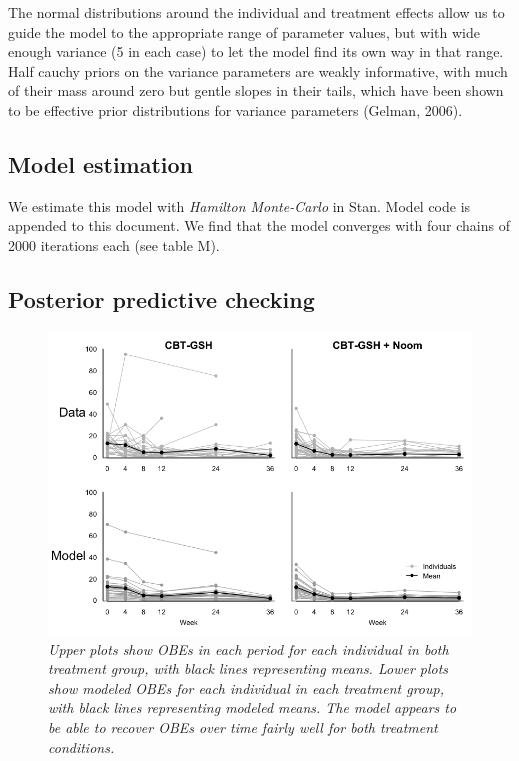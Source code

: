 \documentclass[12pt, oneside]{article}
\begin{document}
The normal distributions around the individual and treatment effects allow us to guide the model to the appropriate range of parameter values, but with wide enough variance (5 in each case) to let the model find its own way in that range.  Half cauchy priors on the variance parameters are weakly informative, with much of their mass around zero but gentle slopes in their tails, which have been shown to be effective prior distributions for variance parameters (Gelman, 2006).

\subsection{Model estimation}
We estimate this model with \emph{Hamilton Monte-Carlo} in Stan.  Model code is appended to this document.  We find that the model converges with four chains of 2000 iterations each (see table M).  

\subsection{Posterior predictive checking}

\begin{figure}
\centering
\includegraphics[width=\textwidth, height=\textheight, keepaspectratio]{ppc_sims.png}
\caption{\emph{Upper plots show OBEs in each period for each individual in both treatment group, with black lines representing means.  Lower plots show modeled OBEs for each individual in each treatment group, with black lines representing modeled means.  The model appears to be able to recover OBEs over time fairly well for both treatment conditions.}}
\end{figure}
\end{document}
